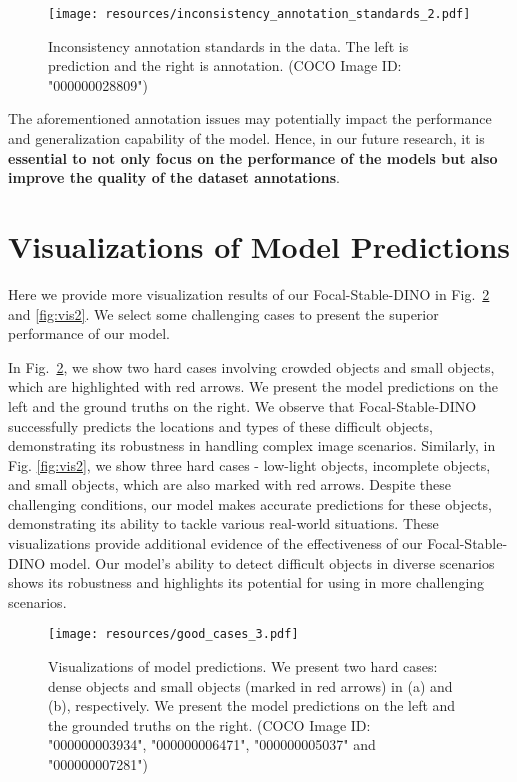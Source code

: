 \documentclass{article}
\begin{document}
\begin{figure}[h]
    \centering
\texttt{[image: resources/inconsistency\_annotation\_standards\_2.pdf]}
\caption{Inconsistency annotation standards in the data. The left is prediction and the right is annotation. (COCO Image ID: "000000028809")
    }
    \label{fig:inconsistency_annotation_standards}
\end{figure} 
The aforementioned annotation issues may potentially impact the performance and generalization capability of the model. Hence, in our future research, it is \textbf{essential to not only focus on the performance of the models but also improve the quality of the dataset annotations}.
















 \section{Visualizations of Model Predictions}
Here we provide more visualization results of our Focal-Stable-DINO in Fig.~\ref{fig:vis1} and \ref{fig:vis2}. We select some challenging cases to present the superior performance of our model.

In Fig.~\ref{fig:vis1}, we show two hard cases involving crowded objects and small objects, which are highlighted with red arrows. We present the model predictions on the left and the ground truths on the right. We observe that Focal-Stable-DINO successfully predicts the locations and types of these difficult objects, demonstrating its robustness in handling complex image scenarios.
Similarly, in Fig. \ref{fig:vis2}, we show three hard cases - low-light objects, incomplete objects, and small objects, which are also marked with red arrows. Despite these challenging conditions, our model makes accurate predictions for these objects, demonstrating its ability to tackle various real-world situations.
These visualizations provide additional evidence of the effectiveness of our Focal-Stable-DINO model. Our model's ability to detect difficult objects in diverse scenarios shows its robustness and highlights its potential for using in more challenging scenarios.

\begin{figure}[h]
    \centering
\texttt{[image: resources/good\_cases\_3.pdf]}
\caption{Visualizations of model predictions. We present two hard cases: dense objects and small objects (marked in red arrows) in (a) and (b), respectively. We present the model predictions on the left and the grounded truths on the right. (COCO Image ID: "000000003934", "000000006471", "000000005037" and "000000007281")
    }
    \label{fig:vis1}
\end{figure}
\end{document}
